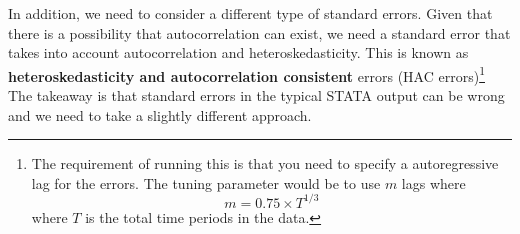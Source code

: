 \documentclass[12pt]{article}
\theoremstyle{definition}
\theoremstyle{property}
\theoremstyle{assumption}
\theoremstyle{example}
\theoremstyle{comment}
\begin{document}
\par\medskip
In addition, we need to consider a different type of standard errors. Given that there is a possibility that autocorrelation can exist, we need a standard error that takes into account autocorrelation and heteroskedasticity. This is known as \textbf{heteroskedasticity and autocorrelation consistent} errors (HAC errors)\footnote{The requirement of running this is that you need to specify a autoregressive lag for the errors. The tuning parameter would be to use $m$ lags where
\[
m = 0.75\times T^{1/3}
\]
where $T$ is the total time periods in the data.} The takeaway is that standard errors in the typical STATA output can be wrong and we need to take a slightly different approach. 



\end{document}
